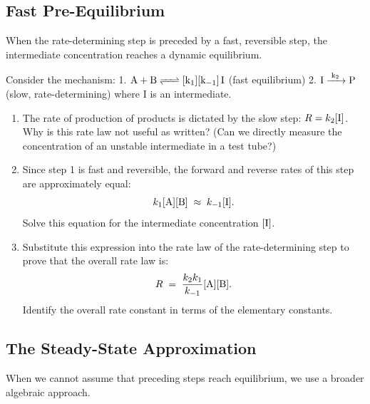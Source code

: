 \documentclass[12pt, a4paper]{book}
\begin{document}
\subsection{Fast Pre-Equilibrium}

When the rate-determining step is preceded by a fast, reversible step, the intermediate concentration reaches a dynamic equilibrium.

\begin{explobox}
Consider the mechanism:
1. $\ce{A + B <=> [k_1][k_{-1}] I}$ (fast equilibrium)
2. $\ce{I ->[k_2] P}$ (slow, rate-determining)
where I is an intermediate.
\begin{enumerate}[label=(\alph*), leftmargin=*]
  \item The rate of production of products is dictated by the slow step: $R = k_2 [\ce{I}]$. Why is this rate law not useful as written? (Can we directly measure the concentration of an unstable intermediate in a test tube?)
  \item Since step 1 is fast and reversible, the forward and reverse rates of this step are approximately equal:
  \[
    k_1 [\ce{A}][\ce{B}] \;\approx\; k_{-1} [\ce{I}].
  \]
  Solve this equation for the intermediate concentration $[\ce{I}]$.
  \item Substitute this expression into the rate law of the rate-determining step to prove that the overall rate law is:
  \[
    R \;=\; \frac{k_2 k_1}{k_{-1}} [\ce{A}][\ce{B}].
  \]
  Identify the overall rate constant in terms of the elementary constants.
\end{enumerate}
\end{explobox}

\subsection{The Steady-State Approximation}

When we cannot assume that preceding steps reach equilibrium, we use a broader algebraic approach.
\end{document}
